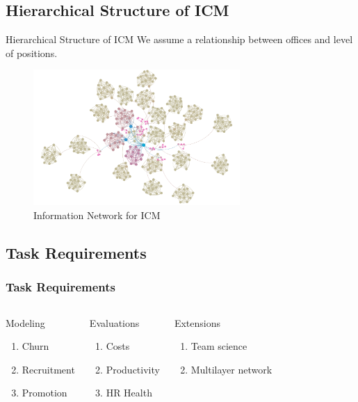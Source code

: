 \documentclass{beamer}
\begin{document}
\subsection{Hierarchical Structure of ICM}
\begin{frame}{Hierarchical Structure of ICM}
We assume a relationship between offices and level of positions.
\begin{figure}
\centering
\includegraphics[width=0.7\textwidth]{fig/inf-net.png}
\caption{Information Network for ICM}
\end{figure}

\end{frame}

\subsection{Task Requirements}
\begin{frame}
\frametitle{Task Requirements}
\begin{columns}[c]
\begin{block}{Modeling}
\begin{enumerate}
\item Churn
\item Recruitment
\item Promotion
\end{enumerate}
\end{block}
\begin{block}{Evaluations}
\begin{enumerate}
\item Costs
\item Productivity
\item HR Health
\end{enumerate}
\end{block}
\begin{block}{Extensions}
\begin{enumerate}
\item Team science
\item Multilayer network
\end{enumerate}
\end{block}
\end{columns}
\end{frame}
\end{document}
